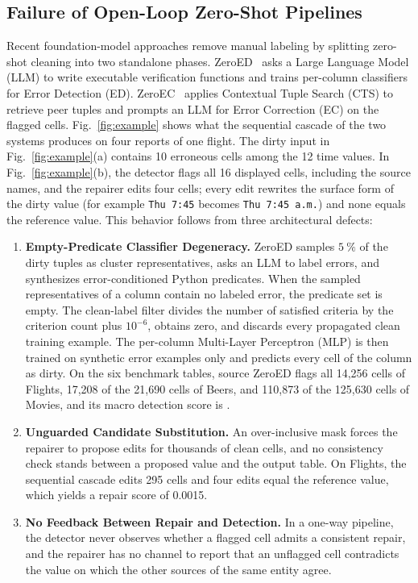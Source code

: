 \documentclass[conference]{IEEEtran}
\begin{document}
\subsection{Failure of Open-Loop Zero-Shot Pipelines}
\label{subsec:intro_gap}

Recent foundation-model approaches remove manual labeling by splitting zero-shot cleaning into two standalone phases. ZeroED~\cite{ni2025zeroed} asks a Large Language Model (LLM) to write executable verification functions and trains per-column classifiers for Error Detection (ED). ZeroEC~\cite{chen2025zeroec} applies Contextual Tuple Search (CTS) to retrieve peer tuples and prompts an LLM for Error Correction (EC) on the flagged cells. Fig.~\ref{fig:example} shows what the sequential cascade of the two systems produces on four reports of one flight. The dirty input in Fig.~\ref{fig:example}(a) contains 10 erroneous cells among the 12 time values. In Fig.~\ref{fig:example}(b), the detector flags all 16 displayed cells, including the source names, and the repairer edits four cells; every edit rewrites the surface form of the dirty value (for example \texttt{Thu 7:45} becomes \texttt{Thu 7:45 a.m.}) and none equals the reference value. This behavior follows from three architectural defects:

\begin{enumerate}[leftmargin=*, itemsep=0pt, topsep=1pt]
\item \textbf{Empty-Predicate Classifier Degeneracy.} ZeroED samples $5~\%$ of the dirty tuples as cluster representatives, asks an LLM to label errors, and synthesizes error-conditioned Python predicates. When the sampled representatives of a column contain no labeled error, the predicate set is empty. The clean-label filter divides the number of satisfied criteria by the criterion count plus $10^{-6}$, obtains zero, and discards every propagated clean training example. The per-column Multi-Layer Perceptron (MLP) is then trained on synthetic error examples only and predicts every cell of the column as dirty. On the six benchmark tables, source ZeroED flags all 14,256 cells of Flights, 17,208 of the 21,690 cells of Beers, and 110,873 of the 125,630 cells of Movies, and its macro detection score is \SourceMacroED{}.
\item \textbf{Unguarded Candidate Substitution.} An over-inclusive mask forces the repairer to propose edits for thousands of clean cells, and no consistency check stands between a proposed value and the output table. On Flights, the sequential cascade edits 295 cells and four edits equal the reference value, which yields a repair score of 0.0015.
\item \textbf{No Feedback Between Repair and Detection.} In a one-way pipeline, the detector never observes whether a flagged cell admits a consistent repair, and the repairer has no channel to report that an unflagged cell contradicts the value on which the other sources of the same entity agree.
\end{enumerate}
\end{document}
